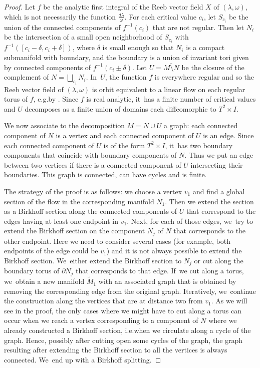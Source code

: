 \documentclass[10pt]{amsart}
\theoremstyle{definition}
\providecommand{\eg}{e.g.}\providecommand{\ie}{i.e.}\providecommand{\etc}{etc.}\providecommand{\resp}{resp.}\providecommand{\cf}{cf.}
\begin{document}
\begin{proof}
Let $f$ be the analytic first integral of the Reeb vector field $X$ of $(\lambda, \omega)$, which is not necessarily the function $\frac{d\lambda}{\omega}$. For each critical value $c_i$, let $S_{c_i}$ be the union of the connected components of $f^{-1}(c_i)$ that are not regular. Then let $N_i$ be the intersection of a small open neighborhood of $S_{c_i}$ with $f^{-1}([c_i-\delta,c_i+\delta])$, where $\delta$ is small enough so that $N_i$ is a compact submanifold with boundary, and the boundary is a union of invariant tori given by connected components of $f^{-1}(c_i \pm \delta)$. Let $U=\overline{M\setminus N}$ be the closure of the complement of $N=\bigsqcup_{c_i}N_i$. In~$U$, the function $f$ is everywhere regular and so the Reeb vector field of $(\lambda,\omega)$ is orbit equivalent to a linear flow on each regular torus of $f$, \eg by \cite[Th.\,3.3]{CV1}. Since $f$ is real analytic, it~has a finite number of critical values and $U$ decomposes as a finite union of domains each diffeomorphic to $T^2\times I$.

We now associate to the decomposition $M=N\cup U$ a graph: each connected component of $N$ is a vertex and each connected component of $U$ is an edge. Since each connected component of $U$ is of the form $T^2\times I$, it~has two boundary components that coincide with boundary components of $N$. Thus we put an edge between two vertices if there is a connected component of $U$ intersecting their boundaries. This graph is connected, can have cycles and is finite.

The strategy of the proof is as follows: we choose a vertex $v_1$ and find a global section of the flow in the corresponding manifold $N_1$. Then we extend the section as a Birkhoff section along the connected components of $U$ that correspond to the edges having at least one endpoint in $v_1$. Next, for each of those edges, we~try to extend the Birkhoff section on the component $N_j$ of $N$ that corresponds to the other endpoint. Here we need to consider several cases (for example, both endpoints of the edge could be $v_1$) and it is not always possible to extend the Birkhoff section. We~either extend the Birkhoff section to $N_j$ or cut along the boundary torus of $\partial N_j$ that corresponds to that edge. If~we cut along a torus, we~obtain a new manifold $\widetilde M_1$ with an associated graph that is obtained by removing the corresponding edge from the original graph. Iteratively, we~continue the construction along the vertices that are at distance two from $v_1$. As we will see in the proof, the only cases where we might have to cut along a torus can occur when we reach a vertex corresponding to a component of $N$ where we already constructed a Birkhoff section, \ie when we circulate along a cycle of the graph. Hence, possibly after cutting open some cycles of the graph, the graph resulting after extending the Birkhoff section to all the vertices is always connected. We~end up with a Birkhoff splitting.


\end{proof}
\end{document}
